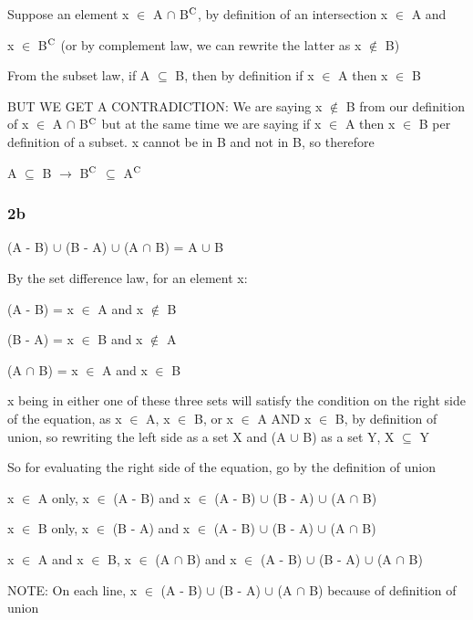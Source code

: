 \documentclass{article}
\begin{document}
Suppose an element x $\in$ A $\cap$ B$\textsuperscript{C}$, by definition of an intersection x $\in$ A and \par\noindent x $\in$ B$\textsuperscript{C}$ (or by complement law, we can rewrite the latter as x $\not\in$ B) \vspace{0.5cm}

\noindent From the subset law, if A $\subseteq$ B, then by definition if x $\in$ A then x $\in$ B \vspace{0.5cm}

\noindent BUT WE GET A CONTRADICTION: We are saying x $\not\in$ B from our definition of x $\in$ A $\cap$ B$\textsuperscript{C}$ but at the same time we are saying if x $\in$ A then x $\in$ B per definition of a subset.  x cannot be in B and not in B, so therefore \par

\noindent A $\subseteq$ B $\rightarrow$ B$\textsuperscript{C}$ $\subseteq$ A$\textsuperscript{C}$

\subsubsection{2b}

(A - B) $\cup$ (B - A) $\cup$ (A $\cap$ B) = A $\cup$ B \vspace{0.5cm}

\noindent By the set difference law, for an element x: \par
\noindent (A - B) = x $\in$ A and x $\not\in$ B \par
\noindent (B - A) = x $\in$ B and x $\not\in$ A \par
\noindent (A $\cap$ B) = x $\in$ A and x $\in$ B \par
\noindent x being in either one of these three sets will satisfy the condition on the right side of the equation, as x $\in$ A, x $\in$ B, or x $\in$ A AND x $\in$ B, by definition of union, so rewriting the left side as a set X and (A $\cup$ B) as a set Y, X $\subseteq$ Y
\vspace{0.5cm}

\noindent So for evaluating the right side of the equation, go by the definition of union \par
\noindent x $\in$ A only, x $\in$ (A - B) and x $\in$ (A - B) $\cup$ (B - A) $\cup$ (A $\cap$ B)\par
\noindent x $\in$ B only, x $\in$ (B - A) and x $\in$ (A - B) $\cup$ (B - A) $\cup$ (A $\cap$ B)\par
\noindent x $\in$ A and x $\in$ B, x $\in$ (A $\cap$ B) and x $\in$ (A - B) $\cup$ (B - A) $\cup$ (A $\cap$ B)\par
\noindent NOTE: On each line, x $\in$ (A - B) $\cup$ (B - A) $\cup$ (A $\cap$ B) because of definition of union \vspace{0.5cm}
\end{document}
